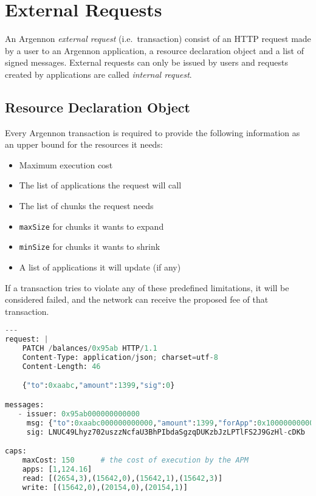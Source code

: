 

\section{External Requests}\label{sec:transactions}

An Argennon \emph{external request} (i.e.\ transaction) consist of an HTTP request made by a user to an Argennon application, a
resource declaration object and a list of signed messages. External requests can only be
issued by users and requests created by applications are called \emph{internal request}.

\subsection{Resource Declaration Object}\label{subsec:resource-declaration}

Every Argennon transaction is required to provide the following information as an upper bound for the
resources it needs:

\begin{itemize}
    \item Maximum execution cost
    \item The list of applications the request will call
    \item The list of chunks the request needs
    \item \texttt{maxSize} for chunks it wants to expand
    \item \texttt{minSize} for chunks it wants to shrink
    \item A list of applications it will update (if any)
\end{itemize}

If a transaction tries to violate any of these predefined limitations, it will be considered failed, and the network
can receive the proposed fee of that transaction.

\begin{lstlisting}[language=python, frame=TB, float, title=An Argennon transaction in YAML format,
    label={lst:txn-example}]
---
request: |
    PATCH /balances/0x95ab HTTP/1.1
    Content-Type: application/json; charset=utf-8
    Content-Length: 46

    {"to":0xaabc,"amount":1399,"sig":0}

messages:
   - issuer: 0x95ab000000000000
     msg: {"to":0xaabc000000000000,"amount":1399,"forApp":0x100000000000000,"nonce":11}
     sig: LNUC49Lhyz702uszzNcfaU3BhPIbdaSgzqDUKzbJzLPTlFS2J9GzHl-cDKb

caps:
    maxCost: 150      # the cost of execution by the APM
    apps: [1,124.16]
    read: [(2654,3),(15642,0),(15642,1),(15642,3)]
    write: [(15642,0),(20154,0),(20154,1)]
\end{lstlisting}


